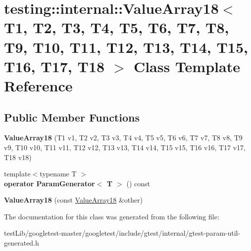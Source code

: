 \hypertarget{classtesting_1_1internal_1_1ValueArray18}{}\section{testing\+:\+:internal\+:\+:Value\+Array18$<$ T1, T2, T3, T4, T5, T6, T7, T8, T9, T10, T11, T12, T13, T14, T15, T16, T17, T18 $>$ Class Template Reference}
\label{classtesting_1_1internal_1_1ValueArray18}
\subsection*{Public Member Functions}
\begin{DoxyCompactItemize}
\item 
\mbox{\label{classtesting_1_1internal_1_1ValueArray18_adf8554745ebde65aba76a7bc6c1a5a06}} 
{\bfseries Value\+Array18} (T1 v1, T2 v2, T3 v3, T4 v4, T5 v5, T6 v6, T7 v7, T8 v8, T9 v9, T10 v10, T11 v11, T12 v12, T13 v13, T14 v14, T15 v15, T16 v16, T17 v17, T18 v18)
\item 
\mbox{\label{classtesting_1_1internal_1_1ValueArray18_a403e37450f8f4b21d38890d172ec57c0}} 
{\footnotesize template$<$typename T $>$ }\\{\bfseries operator Param\+Generator$<$ T $>$} () const
\item 
\mbox{\label{classtesting_1_1internal_1_1ValueArray18_a09150c1d1ee21f7bec61f673b2b8cae0}} 
{\bfseries Value\+Array18} (const \hyperlink{classtesting_1_1internal_1_1ValueArray18}{Value\+Array18} \&other)
\end{DoxyCompactItemize}


The documentation for this class was generated from the following file\+:\begin{DoxyCompactItemize}
\item 
test\+Lib/googletest-\/master/googletest/include/gtest/internal/gtest-\/param-\/util-\/generated.\+h\end{DoxyCompactItemize}
